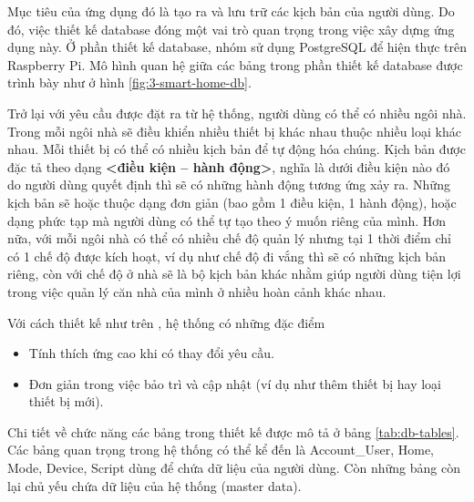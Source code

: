 \documentclass[12pt,a4paper,oneside]{extbook}
\begin{document}
Mục tiêu của ứng dụng đó là tạo ra và lưu trữ các kịch bản của người dùng. Do đó, việc thiết kế database đóng một vai trò quan trọng trong việc xây dựng ứng dụng này. Ở phần thiết kế database, nhóm sử dụng PostgreSQL để hiện thực trên Raspberry Pi. Mô hình quan hệ giữa các bảng trong phần thiết kế database được trình bày như ở hình \ref{fig:3-smart-home-db}.

Trở lại với yêu cầu được đặt ra từ hệ thống, người dùng có thể có nhiều ngôi nhà. Trong mỗi ngôi nhà sẽ điều khiển nhiều thiết bị khác nhau thuộc nhiều loại khác nhau. Mỗi thiết bị có thể có nhiều kịch bản để tự động hóa chúng. Kịch bản được đặc tả theo dạng \textbf{<điều kiện – hành động>}, nghĩa là dưới điều kiện nào đó do người dùng quyết định thì sẽ có những hành động tương ứng xảy ra. Những kịch bản sẽ hoặc thuộc dạng đơn giản (bao gồm 1 điều kiện, 1 hành động), hoặc dạng phức tạp mà người dùng có thể tự tạo theo ý muốn riêng của mình. Hơn nữa, với mỗi ngôi nhà có thể có nhiều chế độ quản lý nhưng tại 1 thời điểm chỉ có 1 chế độ được kích hoạt, ví dụ như chế độ đi vắng thì sẽ có những kịch bản riêng, còn với chế độ ở nhà sẽ là bộ kịch bản khác nhằm giúp người dùng tiện lợi trong việc quản lý căn nhà của mình ở nhiều hoàn cảnh khác nhau.

Với cách thiết kế như trên , hệ thống có những đặc điểm

\begin{itemize}[topsep=1mm,itemsep=-0.5mm]
\item Tính thích ứng cao khi có thay đổi yêu cầu.
\item Đơn giản trong việc bảo trì và cập nhật (ví dụ như thêm thiết bị hay loại thiết bị mới).
\vspace{1mm}
\end{itemize}

Chi tiết về chức năng các bảng trong thiết kế được mô tả ở bảng \ref{tab:db-tables}. Các bảng quan trọng trong hệ thống có thể kể đến là Account\_User, Home, Mode, Device, Script dùng để chứa dữ liệu của người dùng. Còn những bảng còn lại chủ yếu chứa dữ liệu của hệ thống (master data).
\end{document}
